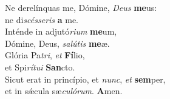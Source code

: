 \evenverse Ne derelínquas me, Dómine, \textit{De}\textit{us} \textbf{me}us:~\*\\
\evenverse ne di\textit{scés}\textit{se}\textit{ris} \textbf{a} me.\\
\oddverse Inténde in adjutó\textit{ri}\textit{um} \textbf{me}um,~\*\\
\oddverse Dómine, Deus, \textit{sa}\textit{lú}\textit{tis} \textbf{me}æ.\\
\evenverse Glória Pa\textit{tri}, \textit{et} \textbf{Fí}lio,~\*\\
\evenverse et Spi\textit{rí}\textit{tu}\textit{i} \textbf{San}cto.\\
\oddverse Sicut erat in princípio, et \textit{nunc}, \textit{et} \textbf{sem}per,~\*\\
\oddverse et in sǽcula sæ\textit{cu}\textit{ló}\textit{rum}. \textbf{A}men.\\
